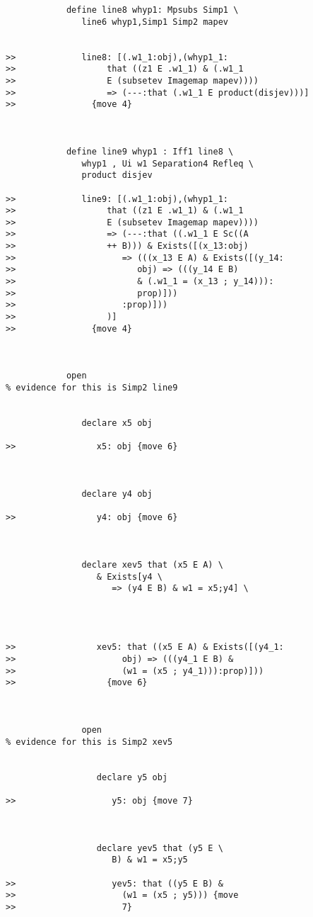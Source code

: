 \documentclass[12pt]{article}
\begin{document}
\begin{verbatim}
            define line8 whyp1: Mpsubs Simp1 \
               line6 whyp1,Simp1 Simp2 mapev


>>             line8: [(.w1_1:obj),(whyp1_1:
>>                  that ((z1 E .w1_1) & (.w1_1
>>                  E (subsetev Imagemap mapev))))
>>                  => (---:that (.w1_1 E product(disjev)))]
>>               {move 4}



            define line9 whyp1 : Iff1 line8 \
               whyp1 , Ui w1 Separation4 Refleq \
               product disjev

>>             line9: [(.w1_1:obj),(whyp1_1:
>>                  that ((z1 E .w1_1) & (.w1_1
>>                  E (subsetev Imagemap mapev))))
>>                  => (---:that ((.w1_1 E Sc((A
>>                  ++ B))) & Exists([(x_13:obj)
>>                     => (((x_13 E A) & Exists([(y_14:
>>                        obj) => (((y_14 E B)
>>                        & (.w1_1 = (x_13 ; y_14))):
>>                        prop)]))
>>                     :prop)]))
>>                  )]
>>               {move 4}



            open
% evidence for this is Simp2 line9


               declare x5 obj

>>                x5: obj {move 6}



               declare y4 obj

>>                y4: obj {move 6}



               declare xev5 that (x5 E A) \
                  & Exists[y4 \
                     => (y4 E B) & w1 = x5;y4] \
                  



>>                xev5: that ((x5 E A) & Exists([(y4_1:
>>                     obj) => (((y4_1 E B) &
>>                     (w1 = (x5 ; y4_1))):prop)]))
>>                  {move 6}



               open
% evidence for this is Simp2 xev5


                  declare y5 obj

>>                   y5: obj {move 7}



                  declare yev5 that (y5 E \
                     B) & w1 = x5;y5

>>                   yev5: that ((y5 E B) &
>>                     (w1 = (x5 ; y5))) {move
>>                     7}




\end{verbatim}
\end{document}
